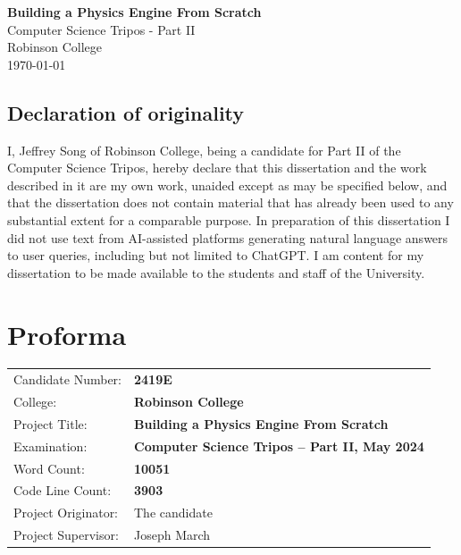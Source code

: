 \documentclass[12pt,a4paper,twoside,openright]{report}
\begin{document}

\pagestyle{empty}
\vspace*{60mm}
\begin{center}
\Huge
\textbf{Building a Physics Engine From Scratch} \\[5mm]
Computer Science Tripos - Part II \\[5mm]
Robinson College \\[5mm]
\today %
\end{center}

\newpage
\section*{Declaration of originality}
I, Jeffrey Song of Robinson College, being a candidate for Part II of the Computer Science Tripos, hereby declare that this dissertation and the work described in it are my own work, unaided except as may be specified below, and that the dissertation does not contain material that has already been used to any substantial extent for a comparable purpose. In preparation of this dissertation I did not use text from AI-assisted platforms generating natural language answers to user queries, including but not limited to ChatGPT. I am content for my dissertation to be made available to the students and staff of the University.
\bigskip
{}
\medskip
{}

\pagestyle{plain}
\chapter*{Proforma}
{\large
\begin{tabular}{ll}
Candidate Number: & \bf 2419E \\
College: & \bf Robinson College \\
Project Title: & \bf Building a Physics Engine From Scratch \\
Examination: & \bf Computer Science Tripos -- Part II, May 2024 \\
Word Count: & \bf 10051\footnotemark[1] \\
Code Line Count: & \bf3903\footnotemark[2] \\
Project Originator: & The candidate \\
Project Supervisor: & Joseph March \\
\end{tabular}
}
\end{document}
